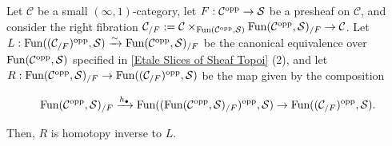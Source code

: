 \documentclass[10pt]{article}
\newcommand{\mS}{\mathcal S}
\newcommand{\C}{\mathcal C}
\theoremstyle{witharg}
\theoremstyle{witharg}
\theoremstyle{witharg2}
\begin{document}
\begin{proposition}{}\label{Equivalence of slice topoi explicit}

    Let $\C$ be a small $(\infty,1)$-category, let $F:\C^{\textnormal{opp}}\rightarrow \mS$ be a presheaf on $\C$, and consider the right fibration $\C_{/F}:=\C\times_{\textnormal{Fun}(\C^{\textnormal{opp}},\mS)}\textnormal{Fun}(\C^{\textnormal{opp}},\mS)_{/F}\rightarrow \C$. Let $L:\textnormal{Fun}((\C_{/F})^{\textnormal{opp}},\mS)\xrightarrow{\sim}\textnormal{Fun}(\C^{\textnormal{opp}},\mS)_{/F}$ be the canonical equivalence over $\textnormal{Fun}(\C^{\textnormal{opp}},\mS)$ specified in \ref{Etale Slices of Sheaf Topoi} (2), and let $R:\textnormal{Fun}(\C^{\textnormal{opp}},\mS)_{/F}\rightarrow \textnormal{Fun}((\C_{/F})^{\textnormal{opp}},\mS)$ be the map given by the composition 

    $$\textnormal{Fun}(\C^{\textnormal{opp}},\mS)_{/F}\xrightarrow{h_\bullet} \textnormal{Fun}((\textnormal{Fun}(\C^{\textnormal{opp}},\mS)_{/F})^{\textnormal{opp}},\mS)\rightarrow \textnormal{Fun}((\C_{/F})^{\textnormal{opp}},\mS).$$

    \noindent Then, $R$ is homotopy inverse to $L$.

    
    
\end{proposition}
\end{document}
